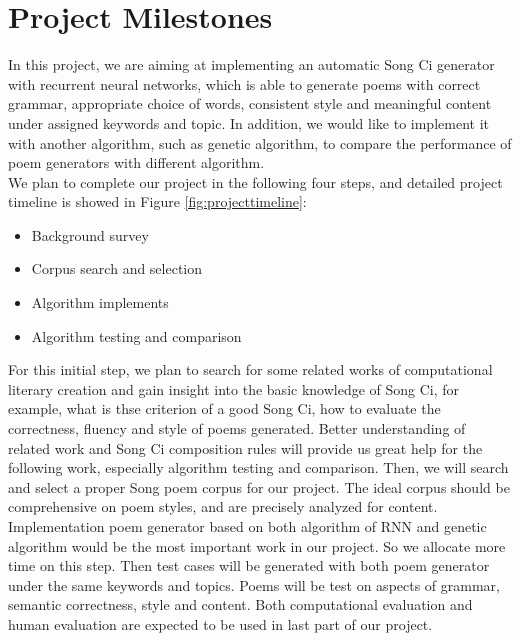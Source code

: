 \section{Project Milestones}
In this project, we are aiming at implementing an automatic Song Ci generator with recurrent neural networks, which is able to generate poems with correct grammar, appropriate choice of words, consistent style and meaningful content under assigned keywords and topic. In addition, we would like to implement it with another algorithm, such as genetic algorithm, to compare the performance of poem generators with different algorithm.\\

We plan to complete our project in the following four steps, and detailed project timeline is showed in Figure \ref{fig:projecttimeline}:
\begin{itemize}
\item Background survey
\item Corpus search and selection
\item Algorithm implements
\item Algorithm testing and comparison
\end{itemize}



For this initial step, we plan to search for some related works of computational literary creation and gain insight into the basic knowledge of Song Ci, for example, what is thse criterion of a good Song Ci, how to evaluate the correctness, fluency and style of poems generated. Better understanding of related work and Song Ci composition rules will provide us great help for the following work, especially algorithm testing and comparison. Then, we will search and select a proper Song poem corpus for our project. The ideal corpus should be comprehensive on poem styles, and are precisely analyzed for content. Implementation poem generator based on both algorithm of RNN and genetic algorithm would be the most important work in our project. So we allocate more time on this step. Then test cases will be generated with both poem generator under the same keywords and topics. Poems will be test on aspects of grammar, semantic correctness, style and content. Both computational evaluation and human evaluation are expected to be used in last part of our project.

